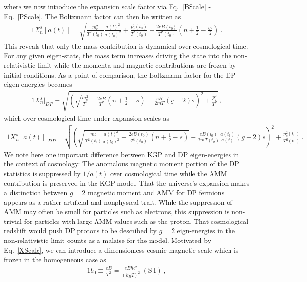 \documentclass[Universe,article,submit,moreauthors,pdftex]{Definitions/mdpi}
\newcommand*{\req}[1]{Eq.~{\eqref{#1}}}
\begin{document}
where we now introduce the expansion scale factor via \req{BScale} - \req{PScale}. The Boltzmann factor can then be written as
\begin{alignat}{1}
    \label{XScale} X_{n}^{s}[a(t)] = \sqrt{\frac{m_{e}^{2}}{T^{2}(t_{0})}\frac{a(t)^{2}}{a(t_{0})^{2}}+\frac{p_{z}^{2}(t_{0})}{T^{2}(t_{0})}+\frac{2eB(t_{0})}{T^{2}(t_{0})}\left(n+\frac{1}{2}-\frac{gs}{2}\right)}\,.
\end{alignat}
This reveals that only the mass contribution is dynamical over cosmological time. For any given eigen-state, the mass term increases driving the state into the non-relativistic limit while the momenta and magnetic contributions are frozen by initial conditions. As a point of comparison, the Boltzmann factor for the DP eigen-energies becomes
\begin{alignat}{1}
    \label{XDP} X_{n}^{s}\vert_{DP} = \sqrt{\left(\sqrt{\frac{m_{e}^{2}}{T^{2}}+\frac{2eB}{T^{2}}\left(n+\frac{1}{2}-s\right)}-\frac{eB}{2mT}(g-2)s\right)^{2}+\frac{p_{z}^{2}}{T^{2}}}\,,
\end{alignat}
which over cosmological time under expansion scales as
\begin{alignat}{1}
    \label{XScaleDP} X_{n}^{s}[a(t)]\vert_{DP} = \sqrt{\left(\sqrt{\frac{m_{e}^{2}}{T^{2}(t_{0})}\frac{a(t)^{2}}{a(t_{0})^{2}}+\frac{2eB(t_{0})}{T^{2}(t_{0})}\left(n+\frac{1}{2}-s\right)}-\frac{eB(t_{0})}{2mT(t_{0})}\frac{a(t_{0})}{a(t)}(g-2)s\right)^{2}+\frac{p_{z}^{2}(t_{0})}{T^{2}(t_{0})}}\,.
\end{alignat}
We note here one important difference between KGP and DP eigen-energies in the context of cosmology: The anomalous magnetic moment portion of the DP statistics is suppressed by $1/a(t)$ over cosmological time while the AMM contribution is preserved in the KGP model. That the universe's expansion makes a distinction between $g=2$ magnetic moment and AMM for DP fermions appears as a rather artificial and nonphysical trait. While the suppression of AMM may often be small for particles such as electrons, this suppression is non-trivial for particles with large AMM values such as the proton. That cosmological redshift would push DP protons to be described by $g=2$ eign-energies in the non-relativistic limit counts as a malaise for the model. Motivated by \req{XScale}, we can introduce a dimensionless cosmic magnetic scale which is frozen in the homogeneous case as
\begin{alignat}{1}
    \label{Bo} b_{0}\equiv\frac{eB}{T^{2}}=\frac{eB\hbar c^{2}}{(k_{B}T)^{2}}\ \mathrm{(S.I)}\,,
\end{alignat}
\end{document}
